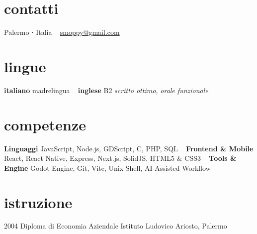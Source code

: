 \documentclass[]{friggeri-cv} %
\begin{document}


\begin{aside} %
\section{contatti}
Palermo ⋅ Italia
~
\href{mailto:smoppy@gmail.com}{smoppy@gmail.com}
\section{lingue}
\textbf{italiano} madrelingua
~
\textbf{inglese} B2
\emph{scritto ottimo,}
\emph{orale funzionale}
\section{competenze}
\textbf{Linguaggi}
JavaScript, Node.js,
GDScript, C, PHP, SQL
~
\textbf{Frontend \& Mobile}
React, React Native,
Express, Next.js,
SolidJS, HTML5 \& CSS3
~
\textbf{Tools \& Engine}
Godot Engine, Git,
Vite, Unix Shell,
AI-Assisted Workflow
\end{aside}

\section{istruzione}
\begin{entrylist}
\entry
{2004}
{Diploma {\normalfont di Economia Aziendale}}
{Istituto Ludovico Ariosto, Palermo}
{}
\end{entrylist}

\end{document}
